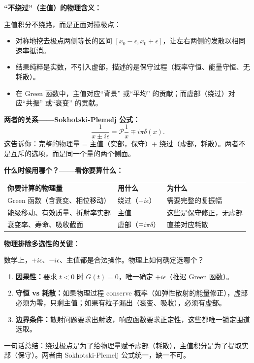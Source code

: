 \begin{derivationbox}[解析延拓与积分路径的选择]
\textbf{``不绕过''（主值）的物理含义：}

主值积分不绕路，而是正面对撞极点：
\begin{itemize}
    \item 对称地挖去极点两侧等长的区间 $[x_0 - \epsilon, x_0 + \epsilon]$，让左右两侧的发散以相同速率抵消。
    \item 结果纯粹是实数，不引入虚部，描述的是保守过程（概率守恒、能量守恒、无耗散）。
    \item 在 Green 函数中，主值对应``背景'' 或``平均'' 的贡献；而虚部（绕过）对应``共振'' 或``衰变'' 的贡献。
\end{itemize}

\textbf{两者的关系——Sokhotski-Plemelj 公式：}
\[
\frac{1}{x \pm i\epsilon} = \mathcal{P}\frac{1}{x} \mp i\pi\delta(x).
\]
这告诉你：完整的物理量 = 主值（实部，保守）+ 绕过（虚部，耗散）。两者不是互斥的选项，而是同一个量的两个侧面。

\textbf{什么时候用哪个？——看你要算什么：}

\begin{tabular}{lll}
\textbf{你要计算的物理量} & \textbf{用什么} & \textbf{为什么} \\
Green 函数（含衰变、相位移动） & 绕过（$+i\epsilon$） & 需要完整的复振幅 \\
能级移动、有效质量、折射率实部 & 主值 & 这些是保守修正，无虚部 \\
衰变率、寿命、吸收截面 & 虚部（$\mp i\pi\delta$） & 直接对应耗散 \\
\end{tabular}

\textbf{物理排除多选性的关键：}

数学上，$+i\epsilon$、$-i\epsilon$、主值都是合法操作。物理上如何确定选哪个？
\begin{enumerate}
    \item \textbf{因果性：}要求 $t < 0$ 时 $G(t) = 0$，唯一确定 $+i\epsilon$（推迟 Green 函数）。
    \item \textbf{守恒 vs 耗散：}如果物理过程 conserve 概率（如弹性散射的能量修正），虚部必须为零，只剩主值；如果有粒子漏出（衰变、吸收），必须有虚部。
    \item \textbf{边界条件：}散射问题要求出射波，响应函数要求正定性，这些都唯一锁定围道选取。
\end{enumerate}

一句话总结：绕过极点是为了给物理量赋予虚部（耗散），主值积分是为了提取实部（保守）。两者由 Sokhotski-Plemelj 公式统一，缺一不可。
\end{derivationbox}

